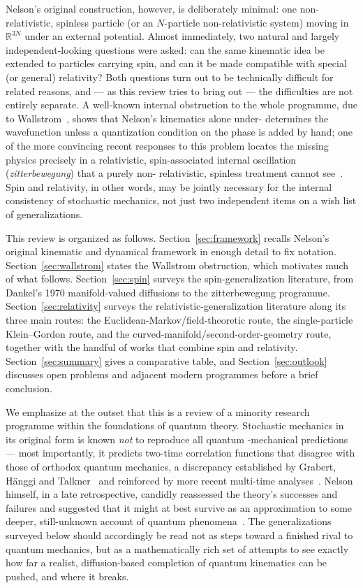 \documentclass[11pt]{article}
\newcommand{\R}{\mathbb{R}}
\begin{document}
Nelson's original construction, however, is deliberately minimal: one non-
relativistic, spinless particle (or an $N$-particle non-relativistic
system) moving in $\R^{3N}$ under an external potential. Almost
immediately, two natural and largely independent-looking questions were
asked: can the same kinematic idea be extended to particles carrying spin,
and can it be made compatible with special (or general) relativity? Both
questions turn out to be technically difficult for related reasons, and ---
as this review tries to bring out --- the difficulties are not entirely
separate. A well-known internal obstruction to the whole programme, due to
Wallstrom~\cite{wallstrom94}, shows that Nelson's kinematics alone under-
determines the wavefunction unless a quantization condition on the phase is
added by hand; one of the more convincing recent responses to this problem
locates the missing physics precisely in a relativistic, spin-associated
internal oscillation (\emph{zitterbewegung}) that a purely non-
relativistic, spinless treatment cannot see~\cite{derakhshani15,
derakhshani16}. Spin and relativity, in other words, may be jointly
necessary for the internal consistency of stochastic mechanics, not just
two independent items on a wish list of generalizations.

This review is organized as follows. Section~\ref{sec:framework} recalls
Nelson's original kinematic and dynamical framework in enough detail to fix
notation. Section~\ref{sec:wallstrom} states the Wallstrom obstruction,
which motivates much of what follows. Section~\ref{sec:spin} surveys the
spin-generalization literature, from Dankel's 1970 manifold-valued
diffusions to the zitterbewegung programme. Section~\ref{sec:relativity}
surveys the relativistic-generalization literature along its three main
routes: the Euclidean-Markov/field-theoretic route, the single-particle
Klein--Gordon route, and the curved-manifold/second-order-geometry route,
together with the handful of works that combine spin and relativity.
Section~\ref{sec:summary} gives a comparative table, and 
Section~\ref{sec:outlook} discusses open problems and adjacent modern
programmes before a brief conclusion.

We emphasize at the outset that this is a review of a minority research
programme within the foundations of quantum theory. Stochastic mechanics 
in its original form is known \emph{not} to reproduce all quantum
-mechanical predictions --- most importantly, it predicts two-time
correlation functions that disagree with those of orthodox quantum
mechanics, a discrepancy established by Grabert, H\"anggi and
Talkner~\cite{grabert79} and reinforced by more recent multi-time
analyses~\cite{derakhshanibacciagaluppi22}. Nelson himself, in a late
retrospective, candidly reassessed the theory's successes and failures and
suggested that it might at best survive as an approximation to some deeper,
still-unknown account of quantum phenomena~\cite{nelson2012}. The
generalizations surveyed below should accordingly be read not as steps
toward a finished rival to quantum mechanics, but as a mathematically rich
set of attempts to see exactly how far a realist, diffusion-based
completion of quantum kinematics can be pushed, and where it breaks.
\end{document}
